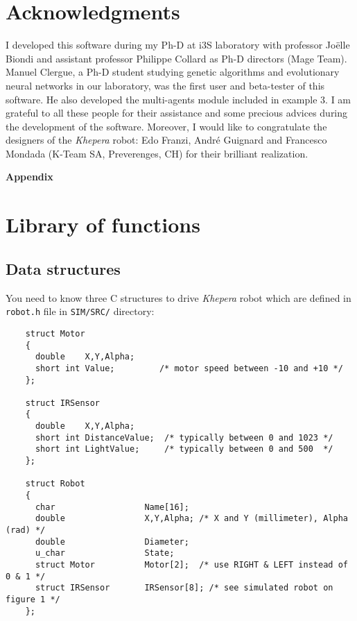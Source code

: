 \documentclass[a4paper,twoside]{article}
\begin{document}
\section{Acknowledgments}

I developed this software during my Ph-D at i3S laboratory with professor
Jo\"elle Biondi and assistant professor Philippe Collard as Ph-D directors (Mage
Team). Manuel Clergue, a Ph-D student studying genetic algorithms and
evolutionary neural networks in our laboratory, was the first user and
beta-tester of this software. He also developed the multi-agents module
included in example 3. I am grateful to all these people for their assistance
and some precious advices during the development of the software. Moreover, I
would like to congratulate the designers of the {\em Khepera} robot: Edo
Franzi, Andr\'e Guignard and  Francesco Mondada (K-Team SA, Preverenges, CH) for
their brilliant realization.



\newpage
\noindent
{\Huge \bf Appendix}

\appendix

\section{Library of functions \label{functions_lib}}

\subsection{Data structures}

You need to know three C structures to drive {\em Khepera} robot which are
defined in {\tt robot.h} file in {\tt SIM/SRC/} directory:

\begin{verbatim}
    struct Motor
    {
      double    X,Y,Alpha;
      short int Value;         /* motor speed between -10 and +10 */
    };

    struct IRSensor
    {
      double    X,Y,Alpha;
      short int DistanceValue;  /* typically between 0 and 1023 */
      short int LightValue;     /* typically between 0 and 500  */
    };

    struct Robot
    {
      char                  Name[16];
      double                X,Y,Alpha; /* X and Y (millimeter), Alpha (rad) */
      double                Diameter;
      u_char                State;
      struct Motor          Motor[2];  /* use RIGHT & LEFT instead of 0 & 1 */
      struct IRSensor       IRSensor[8]; /* see simulated robot on figure 1 */
    };
\end{verbatim}
\end{document}
